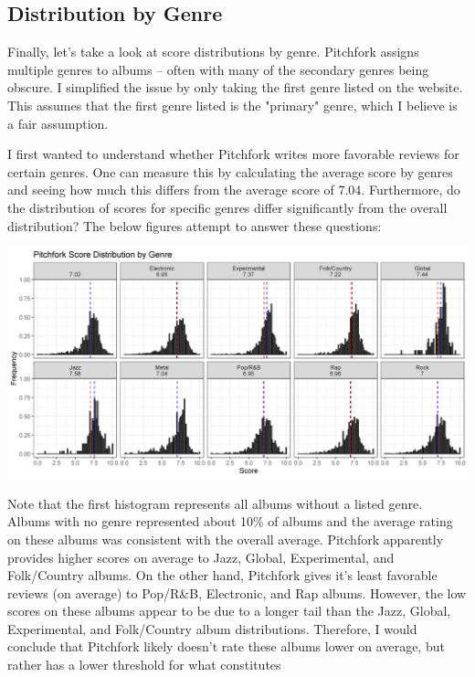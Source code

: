 \documentclass[a4paper,12pt]{article}
\begin{document}
\subsection{Distribution by Genre}

Finally, let's take a look at score distributions by genre. Pitchfork assigns multiple genres to albums -- often with many of the secondary genres being obscure. I simplified the issue by only taking the first genre listed on the website. This assumes that the first genre listed is the "primary" genre, which I believe is a fair assumption. 

I first wanted to understand whether Pitchfork writes more favorable reviews for certain genres. One can measure this by calculating the average score by genres and seeing how much this differs from the average score of 7.04. Furthermore, do the distribution of scores for specific genres differ significantly from the overall distribution? The below figures attempt to answer these questions: 

\includegraphics[width = \linewidth]{"figures/score_dist_by_genre.png"}

Note that the first histogram represents all albums without a listed genre. Albums with no genre represented about 10\% of albums and the average rating on these albums was consistent with the overall average. Pitchfork apparently provides higher scores on average to Jazz, Global, Experimental, and Folk/Country albums. On the other hand, Pitchfork gives it's least favorable reviews (on average) to Pop/R\&B, Electronic, and Rap albums. However, the low scores on these albums appear to be due to a longer tail than the Jazz, Global, Experimental, and Folk/Country album distributions. Therefore, I would conclude that Pitchfork likely doesn't rate these albums lower on average, but rather has a lower threshold for what constitutes 
\end{document}
